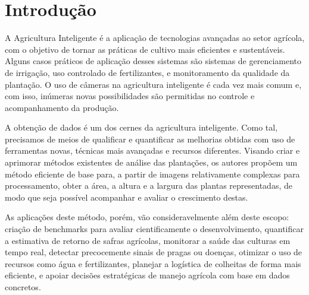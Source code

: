 \chapter{Introdução}

A Agricultura Inteligente é a aplicação de tecnologias avançadas ao setor agrícola, com o objetivo de tornar as práticas de cultivo mais eficientes e sustentáveis. Alguns casos práticos de aplicação desses sistemas são sistemas de gerenciamento de irrigação, uso controlado de fertilizantes, e monitoramento da qualidade da plantação. O uso de câmeras na agricultura inteligente é cada vez mais comum e, com isso, inúmeras novas possibilidades são permitidas no controle e acompanhamento da produção.

A obtenção de dados é um dos cernes da agricultura inteligente. Como tal, precisamos de meios de qualificar e quantificar as melhorias obtidas com uso de ferramentas novas, técnicas mais avançadas e recursos diferentes. Visando criar e aprimorar métodos existentes de análise das plantações, os autores propõem um método eficiente de base para, a partir de imagens relativamente complexas para processamento, obter a área, a altura e a largura das plantas representadas, de modo que seja possível acompanhar e avaliar o crescimento destas. 

As aplicações deste método, porém, vão consideravelmente além deste escopo: criação de benchmarks para avaliar cientificamente o desenvolvimento, quantificar a estimativa de retorno de safras agrícolas, monitorar a saúde das culturas em tempo real, detectar precocemente sinais de pragas ou doenças, otimizar o uso de recursos como água e fertilizantes, planejar a logística de colheitas de forma mais eficiente, e apoiar decisões estratégicas de manejo agrícola com base em dados concretos.
